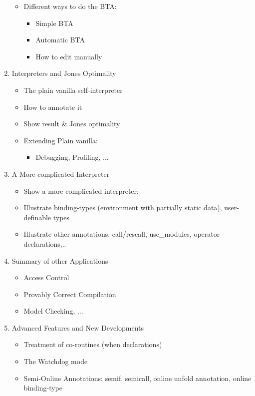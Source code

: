 \documentclass{sig-alternate}
\begin{document}
\begin{enumerate}
\begin{itemize}
   \item Different ways to do the BTA:
     \begin{itemize}
    \item Simple BTA
    \item Automatic BTA
    \item How to edit manually
    \end{itemize}
  \end{itemize}
  
 \item Interpreters and Jones Optimality
  \begin{itemize}
    \item The plain vanilla self-interpreter
    \item  How to annotate it
    \item Show result \& Jones optimality
   \item Extending Plain vanilla:
  \begin{itemize}
    \item Debugging, Profiling, ...
  \end{itemize}
  \end{itemize}
    
    
 \item A More complicated Interpreter
   \begin{itemize}
    \item Show a more complicated interpreter:
    \item Illustrate binding-types (environment with partially static data),
     user-definable types
    \item Illustrate other annotations: call/rescall, use\_modules, operator declarations,..
   \end{itemize}
   
 \item Summary of other Applications
    \begin{itemize}
    \item Access Control
    \item Provably Correct Compilation
    \item Model Checking, ...
   \end{itemize}
   
 \item Advanced Features and New Developments
     \begin{itemize}
    \item Treatment of co-routines (when declarations)
    \item The Watchdog mode
    \item Semi-Online Annotations: semif, semicall,
      online unfold annotation, online binding-type
  \end{itemize}
  
\end{enumerate}


 
\end{document}
